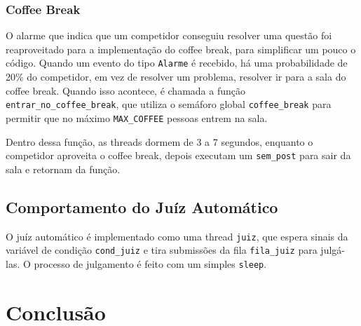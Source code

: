 \documentclass[11pt]{article}
\newcommand{\code}{\lstinline[mathescape=true]}
\begin{document}
	\subsubsection{Coffee Break}
	O alarme que indica que um competidor conseguiu resolver uma questão foi reaproveitado para a
	implementação do coffee break, para simplificar um pouco o código. Quando um evento do tipo
	\code{Alarme} é recebido, há uma probabilidade de 20\% do competidor, em vez de resolver um problema,
	resolver ir para a sala do coffee break. Quando isso acontece, é chamada a função
	\code{entrar_no_coffee_break}, que utiliza o semáforo global \code{coffee_break} para permitir que no
	máximo \code{MAX_COFFEE} pessoas entrem na sala.

	Dentro dessa função, as threads dormem de 3 a 7 segundos, enquanto o competidor aproveita o coffee
	break, depois executam um \code{sem_post} para sair da sala e retornam da função.


	\subsection{Comportamento do Juíz Automático}
	O juíz automático é implementado como uma thread \code{juiz}, que espera sinais da variável de
	condição \code{cond_juiz} e tira submissões da fila \code{fila_juiz} para julgá-las. O processo de
	julgamento é feito com um simples \code{sleep}.


	\section{Conclusão}


	\medskip
	\printbibliography

	
\end{document}
